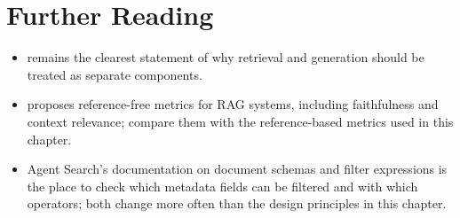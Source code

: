 \section*{Further Reading}

\begin{itemize}[itemsep=2pt]
  \item \citet{lewis2020rag} remains the clearest statement of why retrieval and generation should be treated as separate components.
  \item \citet{es2024ragas} proposes reference-free metrics for RAG systems, including faithfulness and context relevance; compare them with the reference-based metrics used in this chapter.
  \item Agent Search's documentation on document schemas and filter expressions is the place to check which metadata fields can be filtered and with which operators; both change more often than the design principles in this chapter.
\end{itemize}
